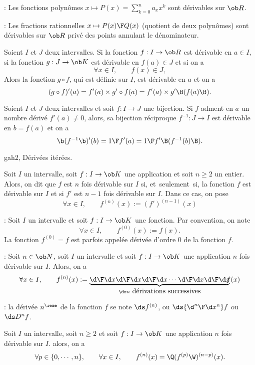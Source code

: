 \Remarque : Les fonctions polyn\^omes $x\mapsto P(x)=\sum_{k=0}^n a_xx^k$ sont d\'erivables sur $\ob R$. 
\bigskip

\Remarque  : Les fractions rationnelles $x\mapsto {P(x)\F Q(x)}$ (quotient de deux polyn\^omes) sont d\'erivables sur $\ob R$ priv\'e des points annulant le d\'enominateur. 
\bigskip

 
\Theoreme []  Soient $I$ et $J$ deux intervalles. Si la fonction $f:I\to\ob R$ 
est d\'erivable en $a\in I$, si la fonction $g:J\to\ob K$ est d\'erivable en $f(a)\in J$ et si on a 
$$
\forall x\in I, \qquad f(x)\in J,
$$
Alors la fonction $g\circ f$, qui est d\'efinie sur $I$, est d\'erivable en $a$ et on a 
$$
(g\circ f)'(a)=f'(a)\times g'\circ f(a)=f'(a)\times g'\B(f(a)\B).
$$


 
\Theoreme []  Soient $I$ et $J$ deux intervalles et soit $f:I\to J$ une bijection. 
Si $f$ adment en $a$ un nombre d\'eriv\'e $f'(a)\neq0$, alors, sa bijection r\'eciproque $f^{-1}:J\to I$ est d\'erivable en $b=f(a)$ et on a 
$$
{\b(f^{-1}\b)'(b)={1\F f'(a)}={1\F f'\B(f^{-1}(b)\B)}}.
$$

\Subsection gah2, D\'eriv\'ees it\'er\'ees. 

\Definition []  Soit $I$ un intervalle, soit $f:I\to\ob K$ une application et soit $n\ge2$ un entier. Alors, on dit que $f$ est $n$ fois d\'erivable sur $I$ si, et~seulement~si, la fonction $f$ est d\'erivable sur $I$ et si $f'$ est $n-1$ fois 
d\'erivable sur $I$. Dans ce cas, on pose 
$$
\forall x\in I,\qquad f^{(n)}(x):=(f')^{(n-1)}(x)
$$


\Remarque : Soit $I$ un intervalle et soit $f:I\to\ob K$ une fonction. Par convention, on note 
$$
\forall x\in I, \qquad f^{(0)}(x):=f(x).
$$
La fonction $f^{(0)}=f$ est parfois appel\'ee d\'eriv\'ee d'ordre $0$ de la fonction $f$. 
\bigskip

\Remarque : Soit $n\in\ob N$, soit $I$ un intervalle et soit $f:I\to\ob K$ une application $n$ fois d\'erivable sur $I$. 
Alors, on a 
$$
\forall x\in I, \qquad f^{(n)}(x):=\underbrace{{\d\F \d x}{\d\F\d x}{\d\F \d x}\cdots{\d\F \d x}{\d\F \d x}}_{\ds n\mbox{ d\'erivations successives}}\!\!\!\!f(x)
$$

\Remarque : la d\'eriv\'ee $n^\ieme$ de la fonction $f$ se note $\ds f^{(n)}$, ou $\ds{\d^n\F\d x^n}f$ ou $\ds D^nf$. 
\bigskip

\Propriete []  Soit $I$ un intervalle, soit $n\ge2$ et soit $f:I\to\ob K$ une application $n$ fois d\'erivable sur $I$. alors, on a $$
\forall p\in\{0,\cdots, n\}, \qquad \forall x\in I, \qquad f^{(n)}(x)=\Q(f^{(p)}\W)^{(n-p)}(x).
$$

